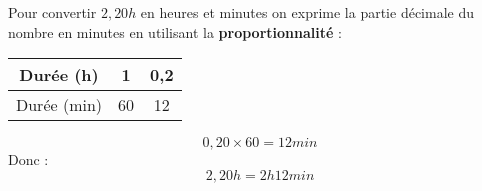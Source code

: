 \begin{pageCours}
\begin{Mt}
Pour convertir $2,20h$ en heures et minutes on exprime la partie décimale du nombre en minutes en utilisant la \textbf{proportionnalité} :
\begin{tabular}{c||c|c}
Durée (h) & 1 & 0,2\\\hline
Durée (min) & 60 & 12\\
\end{tabular}
\[0,20\times60=12min\]
Donc :
\[2,20h=2h12min\]
\end{Mt}




% 

\end{pageCours} 
